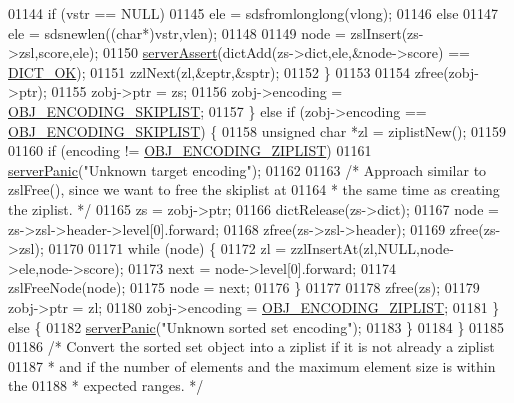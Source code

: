 \begin{DoxyCode}
01144             \textcolor{keywordflow}{if} (vstr == NULL)
01145                 ele = sdsfromlonglong(vlong);
01146             \textcolor{keywordflow}{else}
01147                 ele = sdsnewlen((\textcolor{keywordtype}{char}*)vstr,vlen);
01148 
01149             node = zslInsert(zs->zsl,score,ele);
01150             \hyperlink{server_8h_a88114b5169b4c382df6b56506285e56a}{serverAssert}(dictAdd(zs->dict,ele,&node->score) == 
      \hyperlink{dict_8h_a2afecbeab8f7efbc183048f52f6d17e5}{DICT\_OK});
01151             zzlNext(zl,&eptr,&sptr);
01152         \}
01153 
01154         zfree(zobj->ptr);
01155         zobj->ptr = zs;
01156         zobj->encoding = \hyperlink{server_8h_acfb35db5cb30ed113ed23aeb1a224c4c}{OBJ\_ENCODING\_SKIPLIST};
01157     \} \textcolor{keywordflow}{else} \textcolor{keywordflow}{if} (zobj->encoding == \hyperlink{server_8h_acfb35db5cb30ed113ed23aeb1a224c4c}{OBJ\_ENCODING\_SKIPLIST}) \{
01158         \textcolor{keywordtype}{unsigned} \textcolor{keywordtype}{char} *zl = ziplistNew();
01159 
01160         \textcolor{keywordflow}{if} (encoding != \hyperlink{server_8h_aabf064ede983103f1fd0df2086e84eee}{OBJ\_ENCODING\_ZIPLIST})
01161             \hyperlink{server_8h_a11cc378e7778a830b41240578de3b204}{serverPanic}(\textcolor{stringliteral}{"Unknown target encoding"});
01162 
01163         \textcolor{comment}{/* Approach similar to zslFree(), since we want to free the skiplist at}
01164 \textcolor{comment}{         * the same time as creating the ziplist. */}
01165         zs = zobj->ptr;
01166         dictRelease(zs->dict);
01167         node = zs->zsl->header->level[0].forward;
01168         zfree(zs->zsl->header);
01169         zfree(zs->zsl);
01170 
01171         \textcolor{keywordflow}{while} (node) \{
01172             zl = zzlInsertAt(zl,NULL,node->ele,node->score);
01173             next = node->level[0].forward;
01174             zslFreeNode(node);
01175             node = next;
01176         \}
01177 
01178         zfree(zs);
01179         zobj->ptr = zl;
01180         zobj->encoding = \hyperlink{server_8h_aabf064ede983103f1fd0df2086e84eee}{OBJ\_ENCODING\_ZIPLIST};
01181     \} \textcolor{keywordflow}{else} \{
01182         \hyperlink{server_8h_a11cc378e7778a830b41240578de3b204}{serverPanic}(\textcolor{stringliteral}{"Unknown sorted set encoding"});
01183     \}
01184 \}
01185 
01186 \textcolor{comment}{/* Convert the sorted set object into a ziplist if it is not already a ziplist}
01187 \textcolor{comment}{ * and if the number of elements and the maximum element size is within the}
01188 \textcolor{comment}{ * expected ranges. */}

\end{DoxyCode}
